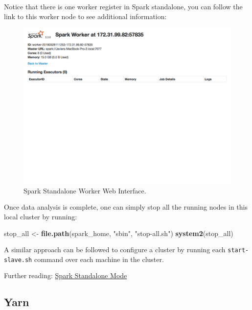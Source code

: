 \documentclass[]{book}
\newenvironment{Shaded}{\begin{snugshade}}{\end{snugshade}}
\newcommand{\KeywordTok}[1]{\textcolor[rgb]{0.13,0.29,0.53}{\textbf{#1}}}
\newcommand{\NormalTok}[1]{#1}
\newcommand{\StringTok}[1]{\textcolor[rgb]{0.31,0.60,0.02}{#1}}
\theoremstyle{definition}
\theoremstyle{definition}
\theoremstyle{definition}
\theoremstyle{remark}
\begin{document}
Notice that there is one worker register in Spark standalone, you can
follow the link to this worker node to see additional information:

\begin{figure}

{\centering \includegraphics[width=13.78in]{images/05-clusters-spark-standalone-web-ui-worker} 

}

\caption{Spark Standalone Worker Web Interface.}\label{fig:spark-standalone-web-ui-worker}
\end{figure}

Once data analysis is complete, one can simply stop all the running
nodes in this local cluster by running:

\begin{Shaded}
\begin{Highlighting}[]
\NormalTok{stop_all <-}\StringTok{ }\KeywordTok{file.path}\NormalTok{(spark_home, }\StringTok{"sbin"}\NormalTok{, }\StringTok{"stop-all.sh"}\NormalTok{)}
\KeywordTok{system2}\NormalTok{(stop_all)}
\end{Highlighting}
\end{Shaded}

A similar approach can be followed to configure a cluster by running
each \texttt{start-slave.sh} command over each machine in the cluster.

Further reading:
\href{https://spark.apache.org/docs/latest/spark-standalone.html}{Spark
Standalone Mode}

\hypertarget{yarn}{%
\subsection{Yarn}\label{yarn}}
\end{document}
